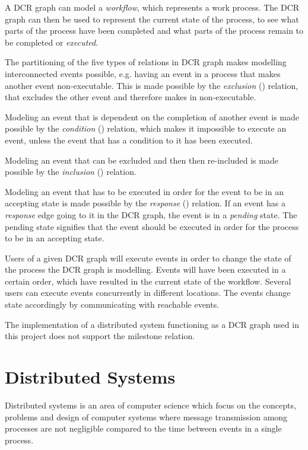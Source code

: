 	A DCR graph can model a \textit{workflow}, which represents a work process. The DCR graph can then be used to represent the current state of the process, to see what parts of the process have been completed and what parts of the process remain to be completed or \textit{executed}. 
	
	The partitioning of the five types of relations in DCR graph makes modelling interconnected events possible, e.g. having an event in a process that makes another event non-executable. This is made possible by the \textit{exclusion} (\exclusion) relation, that excludes the other event and therefore makes in non-executable. 
	
	Modeling an event that is dependent on the completion of another event is made possible by the \textit{condition} (\condition) relation, which makes it impossible to execute an event, unless the event that has a condition to it has been executed.
	
	Modeling an event that can be excluded and then then re-included is made possible by the \textit{inclusion} (\inclusion) relation. 
	
	Modeling an event that has to be executed in order for the event to be in an accepting state  is made possible by the \textit{response} (\response) relation. If an event has a \textit{response} edge going to it in the DCR graph, the event is in a \textit{pending} state. The pending state signifies that the event should be executed in order for the process to be in an accepting state.
	
	Users of a given DCR graph will execute events in order to change the state of the process the DCR graph is modelling. Events will have been executed in a certain order, which have resulted in the current state of the workflow. Several users can execute events concurrently in different locations. The events change state accordingly by communicating with reachable events. 
	
	The implementation of a distributed system functioning as a DCR graph used in this project does not support the milestone relation. 
	
	\section{Distributed Systems}
		Distributed systems is an area of computer science which focus on the concepts, problems and design of computer systems where message transmission among processes are not negligible compared to the time between events in a single process.
		
